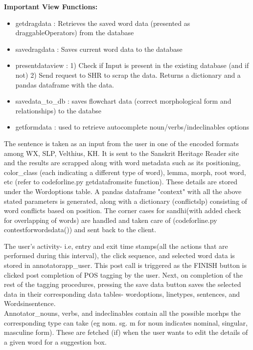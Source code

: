 \documentclass[12pt]{article}
\begin{document}
\textbf{Important View Functions:}
\begin{itemize}
	\item  getdragdata : Retrieves the saved word data (presented as draggableOperators) from the database
	\item  savedragdata : Saves current word data to the database
	\item  presentdataview : 1) Check if Input is present in the existing database (and if not) 2) Send request to SHR to scrap the data. Returns a dictionary and a pandas dataframe with the data.
	\item  savedata\_to\_db : saves flowchart data (correct morphological form and relationships) to the databse
	\item  getformdata : used to retrieve autocomplete noun/verbs/indeclinables options
\end{itemize}

The sentence is taken as an input from the user in one of the encoded formats among WX, SLP, Velthius, KH. It is sent to the Sanskrit Heritage Reader site and the results are scrapped along with word metadata such as its positioning, color\_class (each indicating a different type of word), lemma, morph, root word, etc (refer to codeforline.py getdatafromsite function). These details are stored under the Wordoptions table. A pandas dataframe "context" with all the above stated parameters is generated, along with a dictionary (conflictslp) consisting of word conflicts based on position. The corner cases for sandhi(with added check for overlapping of words) are handled and taken care of (codeforline.py contestforwordsdata()) and sent back to the client.

The user's activity- i.e, entry and exit time stamps(all the actions that are performed during this interval), the click sequence, and selected word data is stored in annotatorapp\_user. This post call is triggered as the FINISH button is clicked post completion of POS tagging by the user. Next, on completion of the rest of the tagging procedures, pressing the save data button saves the selected data in their corresponding data tables- wordoptions, linetypes, sentences, and Wordsinsentence. \\ 

Annotator\_nouns, verbs, and indeclinables contain all the possible morhps the corresponding type can take (eg nom. sg. m for noun indicates nominal, singular, masculine form). These are fetched (if) when the user wants to edit the details of a given word for a suggestion box.  \\
\end{document}
